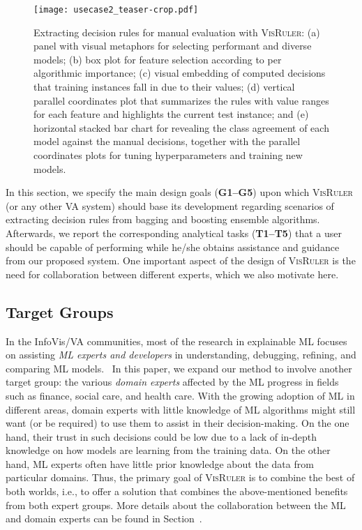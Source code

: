 \begin{figure*}[tb]
\centering
\texttt{[image: usecase2\_teaser-crop.pdf]}
 \caption{Extracting decision rules for manual evaluation with \textsc{VisRuler}: (a) panel with visual metaphors for selecting performant and diverse models; (b) box plot for feature selection according to per algorithmic importance; (c) visual embedding of computed decisions that training instances fall in due to their values; (d) vertical parallel coordinates plot that summarizes the rules with value ranges for each feature and highlights the current test instance; and (e) horizontal stacked bar chart for revealing the class agreement of each model against the manual decisions, together with the parallel coordinates plots for tuning hyperparameters and training new models.}
 \label{fig:teaser}
\end{figure*}

In this section, we specify the main design goals (\textbf{G1--G5}) upon which \textsc{VisRuler} (or any other VA system) should base its development regarding scenarios of extracting decision rules from bagging and boosting ensemble algorithms. Afterwards, we report the corresponding analytical tasks (\textbf{T1--T5}) that a user should be capable of performing while he/she obtains assistance and guidance from our proposed system. One important aspect of the design of \textsc{VisRuler} is the need for collaboration between different experts, which we also motivate here.


\subsection{Target Groups}

In the InfoVis/VA communities, most of the research in explainable ML focuses on assisting \emph{ML experts and developers} in understanding, debugging, refining, and comparing ML models.~\cite{Chatzimparmpas2020A,Chatzimparmpas2020The} In this paper, we expand our method to involve another target group: the various \emph{domain experts} affected by the ML progress in fields such as finance, social care, and health care. With the growing adoption of ML in different areas, domain experts with little knowledge of ML algorithms might still want (or be required) to use them to assist in their decision-making. On the one hand, their trust in such decisions could be low due to a lack of in-depth knowledge on how models are learning from the training data. On the other hand, ML experts often have little prior knowledge about the data from particular domains. Thus, the primary goal of \textsc{VisRuler} is to combine the best of both worlds, i.e., to offer a solution that combines the above-mentioned benefits from both expert groups. More details about the collaboration between the ML and domain experts can be found in Section~.

